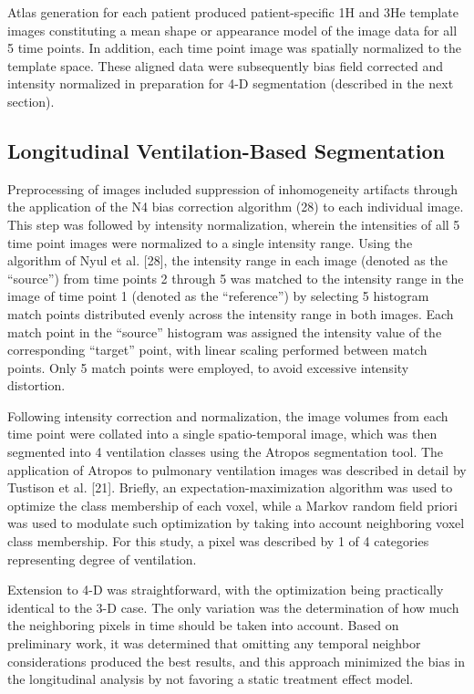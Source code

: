 \documentclass[11pt,]{article}
\begin{document}
Atlas generation for each patient produced patient-specific 1H and 3He
template images constituting a mean shape or appearance model of the
image data for all 5 time points. In addition, each time point image was
spatially normalized to the template space. These aligned data were
subsequently bias field corrected and intensity normalized in
preparation for 4-D segmentation (described in the next section).

\subsection{Longitudinal Ventilation-Based
Segmentation}\label{longitudinal-ventilation-based-segmentation}

Preprocessing of images included suppression of inhomogeneity artifacts
through the application of the N4 bias correction algorithm (28) to each
individual image. This step was followed by intensity normalization,
wherein the intensities of all 5 time point images were normalized to a
single intensity range. Using the algorithm of Nyul et al. {[}28{]}, the
intensity range in each image (denoted as the ``source'') from time
points 2 through 5 was matched to the intensity range in the image of
time point 1 (denoted as the ``reference'') by selecting 5 histogram
match points distributed evenly across the intensity range in both
images. Each match point in the ``source'' histogram was assigned the
intensity value of the corresponding ``target'' point, with linear
scaling performed between match points. Only 5 match points were
employed, to avoid excessive intensity distortion.

Following intensity correction and normalization, the image volumes from
each time point were collated into a single spatio-temporal image, which
was then segmented into 4 ventilation classes using the Atropos
segmentation tool. The application of Atropos to pulmonary ventilation
images was described in detail by Tustison et al. {[}21{]}. Briefly, an
expectation-maximization algorithm was used to optimize the class
membership of each voxel, while a Markov random field priori was used to
modulate such optimization by taking into account neighboring voxel
class membership. For this study, a pixel was described by 1 of 4
categories representing degree of ventilation.

Extension to 4-D was straightforward, with the optimization being
practically identical to the 3-D case. The only variation was the
determination of how much the neighboring pixels in time should be taken
into account. Based on preliminary work, it was determined that omitting
any temporal neighbor considerations produced the best results, and this
approach minimized the bias in the longitudinal analysis by not favoring
a static treatment effect model.
\end{document}
